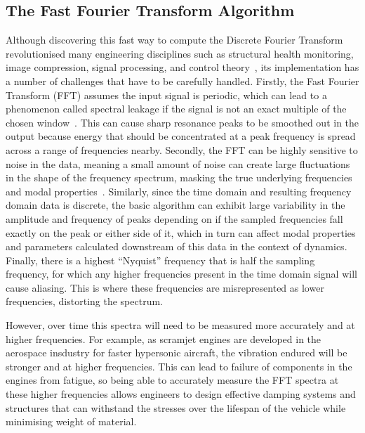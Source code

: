 \documentclass[12pt]{article}
\begin{document}
    \subsection{The Fast Fourier Transform Algorithm}
    Although discovering this fast way to compute the Discrete Fourier Transform revolutionised many engineering disciplines such as structural health monitoring, image compression, signal processing, and control theory~\cite{Byjus2023}, its implementation has a number of challenges that have to be carefully handled.
    Firstly, the Fast Fourier Transform (FFT) assumes the input signal is periodic, which can lead to a phenomenon called spectral leakage if the signal is not an exact multiple of the chosen window~\cite{MathStackExchange2023}.
    This can cause sharp resonance peaks to be smoothed out in the output because energy that should be concentrated at a peak frequency is spread across a range of frequencies nearby.
    Secondly, the FFT can be highly sensitive to noise in the data, meaning a small amount of noise can create large fluctuations in the shape of the frequency spectrum, masking the true underlying frequencies and modal properties~\cite{MathStackExchange2023}.
    Similarly, since the time domain and resulting frequency domain data is discrete, the basic algorithm can exhibit large variability in the amplitude and frequency of peaks depending on if the sampled frequencies fall exactly on the peak or either side of it, which in turn can affect modal properties and parameters calculated downstream of this data in the context of dynamics.
    Finally, there is a highest ``Nyquist'' frequency that is half the sampling frequency, for which any higher frequencies present in the time domain signal will cause aliasing.
    This is where these frequencies are misrepresented as lower frequencies, distorting the spectrum.

    However, over time this spectra will need to be measured more accurately and at higher frequencies.
    For example, as scramjet engines are developed in the aerospace insdustry for faster hypersonic aircraft, the vibration endured will be stronger and at higher frequencies.
    This can lead to failure of components in the engines from fatigue, so being able to accurately measure the FFT spectra at these higher frequencies allows engineers to design effective damping systems and structures that can withstand the stresses over the lifespan of the vehicle while minimising weight of material.
\end{document}

